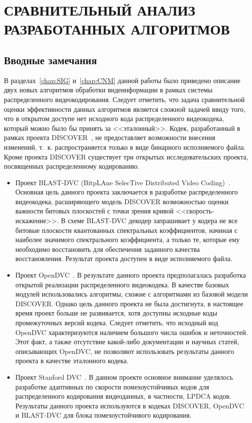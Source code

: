 \newpage
\chapter{СРАВНИТЕЛЬНЫЙ АНАЛИЗ РАЗРАБОТАННЫХ АЛГОРИТМОВ}
\label{chap:ExpResults}

\section{Вводные замечания}
\label{chap:ExpResults:Intro}

В разделах~\ref{chap:SIG} и~\ref{chap:CNM} данной работы было приведено описание двух новых алгоритмов обработки видеинформации в рамках системы распределенного видеокодирования. Следует отметить, что задача сравнительной оценки эффективности данных алгоритмов является сложной задачей ввиду того, что в открытом доступе нет исходного кода распределенного видеокодека, который можно было бы принять за <<эталонный>>. Кодек, разработанный в рамках проекта  DISCOVER~\cite{Artigas2007}, не предоставляет возможности внесения изменений, т.~к. распространяется только в виде бинарного исполняемого файла. Кроме проекта DISCOVER существует три открытых исследовательских проекта, посвященных распределенному кодированию.

\begin{itemize}
    \item Проект BLAST-DVC (BitpLAne SelecTive Distributed Video Coding)~\cite{5074834}. Основная цель данного проекта заключается в разработке распределенного видеокодека, расширяющего модель DISCOVER возможностью оценки важности битовых плоскостей с точки зрения кривой <<скорость-искажение>>. В схеме BLAST-DVC декодер запрашивает у кодера не все битовые плоскости квантованных спектральных коэффициентов, начиная с наиболее значимого спектрального коэффициента, а только те, которые ему необходимо восстановить для обеспечения заданного качества восстановления. Результат проекта доступен в виде исполняемого файла.
    
    \item Проект OpenDVC~\cite{6471251}. В результате данного проекта предполагалась разработка открытой реализации распределенного видеокодека. В качестве базовых модулей использовались алгоритмы, схожие с алгоритмами из базовой модели DISCOVER. Однако цель данного проекта не была достигнута, в настоящее время проект больше не развивается, хотя доступны исходные коды промежуточных версий кодека. Следует отметить, что исходный код OpenDVC характеризуются наличием большого числа ошибок и неточностей. Этот факт, а также отсутствие какой-либо документации и научных статей, описывающих OpenDVC, не позволяют использовать результаты данного проекта в качестве эталонного кодека.
    
    \item Проект Stanford DVC~\cite{Varodayan:2008:WCV:1379459.1379595}. В данном проекте основное внимание уделялось разработке адаптивных по скорости помехоустойчивых кодов для распределенного кодирования видеоданных, в частности, LPDCA кодов. Результаты данного проекта используются в кодеках DISCOVER, OpenDVC и BLAST-DVC для блока помехоустойчивого кодирования.
\end{itemize}

